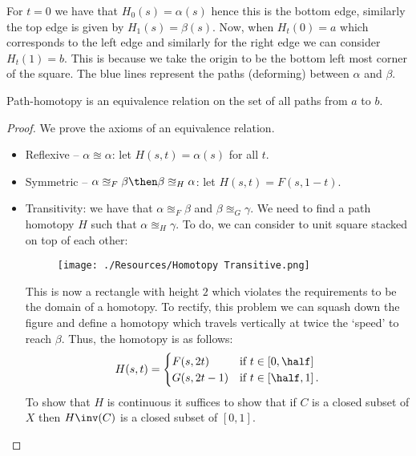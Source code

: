 \documentclass[12pt, a4paper]{article}
\begin{document}
For \(t=0\) we have that \(H_0(s)=\alpha(s)\) hence this is the bottom edge, similarly the top edge is given by \(H_1(s)=\beta(s)\). Now, when \(H_t(0)=a\) which corresponds to the left edge and similarly for the right edge we can consider \(H_t(1)=b\). This is because we take the origin to be the bottom left most corner of the square.
The blue lines represent the paths (deforming) between \(\alpha\) and \(\beta\).

\begin{mdprop}
    Path-homotopy is an equivalence relation on the set of all paths from \(a\) to \(b\).
\end{mdprop}

\begin{proof}
    We prove the axioms of an equivalence relation.
    \begin{itemize}
        \item Reflexive -- \(\alpha \approxeq \alpha\): let \(H(s,t)=\alpha(s)\) for all \(t\).
        \item Symmetric -- \(\alpha \approxeq_F \beta \then \beta\approxeq_H \alpha\): let \(H(s,t) = F(s,1-t)\).
        \item Transitivity: we have that \(\alpha \approxeq_F \beta\) and \(\beta \approxeq_G \gamma\). We need to find a path homotopy \(H\) such that \(\alpha \approxeq_H \gamma\). To do, we can consider to unit square stacked on top of each other:
        \begin{figure}[H]
             \begin{center}
                 \texttt{[image: ./Resources/Homotopy Transitive.png]}
             \end{center}
        \end{figure}
        This is now a rectangle with height \(2\) which violates the requirements to be the domain of a homotopy. To rectify, this problem we can squash down the figure and define a homotopy which travels vertically at twice the `speed' to reach \(\beta\). Thus, the homotopy is as follows:
        \[H(s,t) = \begin{cases}
            F(s,2t) &\text{if } t \in \left[ 0,\half \right] \\
            G(s,2t-1) &\text{if } t \in \left[ \half,1 \right].
        \end{cases}\]
        To show that \(H\) is continuous it suffices to show that if \(C\) is a closed subset of \(X\) then \(H\inv(C)\) is a closed subset of \([0,1]\).
    \end{itemize}
\end{proof}
\end{document}
